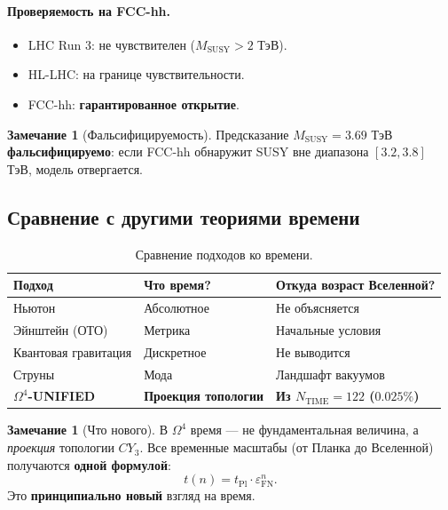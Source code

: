 \documentclass[11pt,a4paper]{article}
\newcommand{\CY}{CY_3}
\newcommand{\Om}{\Omega^4}
\newcommand{\MSUSY}{M_{\text{SUSY}}}
\newcommand{\epsFN}{\varepsilon_{\text{FN}}}
\theoremstyle{definition}
\newtheorem{remark}[theorem]{Замечание}
\begin{document}
\paragraph{Проверяемость на FCC-hh.}
\begin{itemize}
    \item LHC Run 3: не чувствителен ($\MSUSY > 2$ ТэВ).
    \item HL-LHC: на границе чувствительности.
    \item FCC-hh: \textbf{гарантированное открытие}.
\end{itemize}

\begin{remark}[Фальсифицируемость]
\label{rem:falsifiability-review}
Предсказание $\MSUSY = 3.69$ ТэВ \textbf{фальсифицируемо}: 
если FCC-hh обнаружит SUSY вне диапазона $[3.2, 3.8]$ ТэВ, 
модель отвергается.
\end{remark}
\subsection{Сравнение с другими теориями времени}
\label{subsec:time-comparison}

\begin{table}[htbp]
\centering
\caption{Сравнение подходов ко времени.}
\label{tab:time-comparison}
\begin{tabular}{p{3.5cm}p{4cm}p{5cm}}
\toprule
Подход & Что время? & Откуда возраст Вселенной? \\
\midrule
Ньютон & Абсолютное & Не объясняется \\
Эйнштейн (ОТО) & Метрика & Начальные условия \\
Квантовая гравитация & Дискретное & Не выводится \\
Струны & Мода & Ландшафт вакуумов \\
\textbf{$\Om$-UNIFIED} & \textbf{Проекция топологии} & 
    \textbf{Из $N_{\text{TIME}} = 122$ ($0.025\%$)} \\
\bottomrule
\end{tabular}
\end{table}

\begin{remark}[Что нового]
\label{rem:time-new}
В $\Om$ время — не фундаментальная величина, а \emph{проекция} 
топологии $\CY$. Все временные масштабы (от Планка до Вселенной) 
получаются \textbf{одной формулой}:
\begin{equation}
    t(n) = t_{\text{Pl}} \cdot \epsFN^n.
\end{equation}
Это \textbf{принципиально новый} взгляд на время.
\end{remark}
\end{document}
